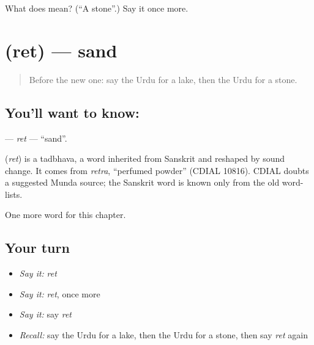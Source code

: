 \begin{tcolorbox}[breakable,colback=teal!4,colframe=teal!35!black,title={Before you move on}]
What does  mean? (\textquotedblleft{}A stone\textquotedblright{}.) Say it once more.
\end{tcolorbox}
\section[\texorpdfstring{\ur{ریت} (ret)}{ریت (ret)}]{ (ret) — sand}

\label{lesson:UR-C65-ret}



\begin{quote}
Before the new one: say the Urdu for a lake, then the Urdu for a stone.
\end{quote}

\subsection*{You'll want to know: }
\textbf{} — \emph{ret} — \textquotedblleft{}sand\textquotedblright{}.

\begin{cousinweb}
\textbf{} (\emph{ret}) is a tadbhava, a word inherited from Sanskrit and reshaped by sound change. It comes from \emph{retra}, \textquotedblleft{}perfumed powder\textquotedblright{} (CDIAL 10816). CDIAL doubts a suggested Munda source; the Sanskrit word is known only from the old word-lists.
\end{cousinweb}

\begin{grammarlens}[title={What you've built}]
One more word for this chapter.
\end{grammarlens}

\subsection*{Your turn}
\begin{itemize}
\raggedright
  \item \emph{Say it:} \emph{ret}
  \item \emph{Say it:} \emph{ret}, once more
  \item \emph{Say it:} say \emph{ret}
  \item \emph{Recall:} say the Urdu for a lake, then the Urdu for a stone, then say \emph{ret} again
\end{itemize}

